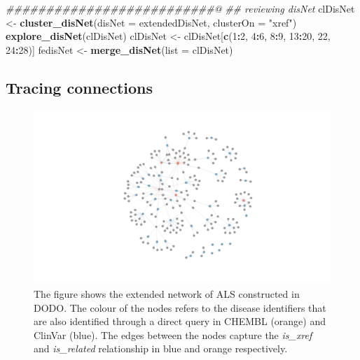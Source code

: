 \documentclass[9pt,a4paper,]{extarticle}
\newenvironment{Shaded}{\begin{snugshade}}{\end{snugshade}}
\newcommand{\CommentTok}[1]{\textcolor[rgb]{0.56,0.35,0.01}{\textit{#1}}}
\newcommand{\DataTypeTok}[1]{\textcolor[rgb]{0.13,0.29,0.53}{#1}}
\newcommand{\DecValTok}[1]{\textcolor[rgb]{0.00,0.00,0.81}{#1}}
\newcommand{\KeywordTok}[1]{\textcolor[rgb]{0.13,0.29,0.53}{\textbf{#1}}}
\newcommand{\NormalTok}[1]{#1}
\newcommand{\OperatorTok}[1]{\textcolor[rgb]{0.81,0.36,0.00}{\textbf{#1}}}
\newcommand{\StringTok}[1]{\textcolor[rgb]{0.31,0.60,0.02}{#1}}
\begin{document}
\begin{Shaded}
\begin{Highlighting}[]
\CommentTok{##########################@}
\CommentTok{## reviewing disNet}
\NormalTok{clDisNet <-}\StringTok{ }\KeywordTok{cluster_disNet}\NormalTok{(}\DataTypeTok{disNet =}\NormalTok{ extendedDisNet,}
                           \DataTypeTok{clusterOn =} \StringTok{"xref"}\NormalTok{)}
\KeywordTok{explore_disNet}\NormalTok{(clDisNet)}
\NormalTok{clDisNet <-}\StringTok{ }\NormalTok{clDisNet[}\KeywordTok{c}\NormalTok{(}\DecValTok{1}\OperatorTok{:}\DecValTok{2}\NormalTok{, }\DecValTok{4}\OperatorTok{:}\DecValTok{6}\NormalTok{, }\DecValTok{8}\OperatorTok{:}\DecValTok{9}\NormalTok{, }\DecValTok{13}\OperatorTok{:}\DecValTok{20}\NormalTok{, }\DecValTok{22}\NormalTok{, }\DecValTok{24}\OperatorTok{:}\DecValTok{28}\NormalTok{)]}
\NormalTok{fedisNet <-}\StringTok{ }\KeywordTok{merge_disNet}\NormalTok{(}\DataTypeTok{list =}\NormalTok{ clDisNet)}
\end{Highlighting}
\end{Shaded}

\hypertarget{tracing-connections}{%
\subsection{Tracing connections}\label{tracing-connections}}



\begin{figure}

{\centering \includegraphics[width=1.2\linewidth]{DODO-F1000-publication_files/figure-latex/traceConn-1} 

}

\caption{The figure shows the extended network of ALS constructed in DODO. The colour of the nodes refers to the disease identifiers that are also identified through a direct query in CHEMBL (orange) and ClinVar (blue). The edges between the nodes capture the \emph{is\_xref} and \emph{is\_related} relationship in blue and orange respectively.}\label{fig:traceConn}
\end{figure}
\end{document}
